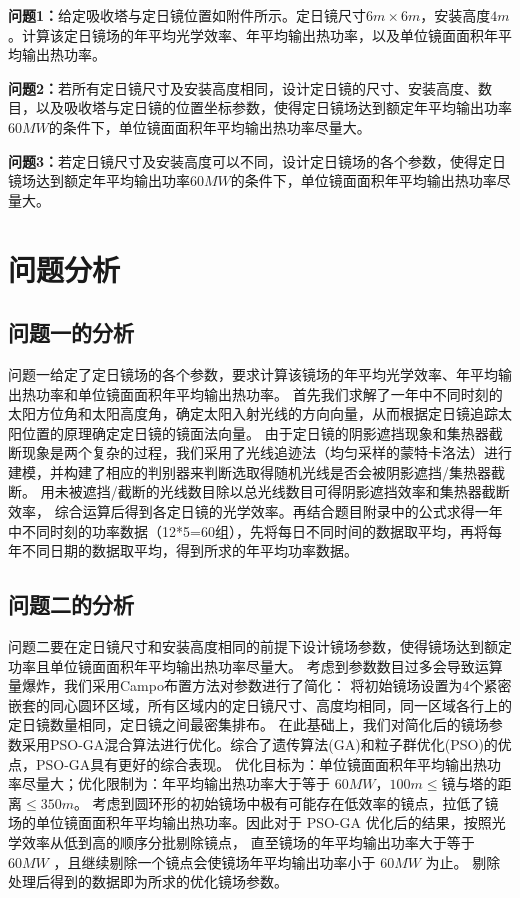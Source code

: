 \documentclass{article}
\numberwithin{equation}{subsection}
\begin{document}
\textbf{问题1：}给定吸收塔与定日镜位置如附件所示。定日镜尺寸$6m\times 6m$，安装高度$4m$。计算该定日镜场的年平均光学效率、年平均输出热功率，以及单位镜面面积年平均输出热功率。

\textbf{问题2：}若所有定日镜尺寸及安装高度相同，设计定日镜的尺寸、安装高度、数目，以及吸收塔与定日镜的位置坐标参数，使得定日镜场达到额定年平均输出功率$60MW$的条件下，单位镜面面积年平均输出热功率尽量大。

\textbf{问题3：}若定日镜尺寸及安装高度可以不同，设计定日镜场的各个参数，使得定日镜场达到额定年平均输出功率$60MW$的条件下，单位镜面面积年平均输出热功率尽量大。

{\centering\section{问题分析}}

\subsection{问题一的分析}
问题一给定了定日镜场的各个参数，要求计算该镜场的年平均光学效率、年平均输出热功率和单位镜面面积年平均输出热功率。
首先我们求解了一年中不同时刻的太阳方位角和太阳高度角，确定太阳入射光线的方向向量，从而根据定日镜追踪太阳位置的原理确定定日镜的镜面法向量。
由于定日镜的阴影遮挡现象和集热器截断现象是两个复杂的过程，我们采用了光线追迹法（均匀采样的蒙特卡洛法）进行建模，并构建了相应的判别器来判断选取得随机光线是否会被阴影遮挡/集热器截断。
用未被遮挡/截断的光线数目除以总光线数目可得阴影遮挡效率和集热器截断效率，
综合运算后得到各定日镜的光学效率。再结合题目附录中的公式求得一年中不同时刻的功率数据（12*5=60组），先将每日不同时间的数据取平均，再将每年不同日期的数据取平均，得到所求的年平均功率数据。

\subsection{问题二的分析}
问题二要在定日镜尺寸和安装高度相同的前提下设计镜场参数，使得镜场达到额定功率且单位镜面面积年平均输出热功率尽量大。
考虑到参数数目过多会导致运算量爆炸，我们采用Campo布置方法\cite{7}对参数进行了简化：
将初始镜场设置为4个紧密嵌套的同心圆环区域，所有区域内的定日镜尺寸、高度均相同，同一区域各行上的定日镜数量相同，定日镜之间最密集排布。
在此基础上，我们对简化后的镜场参数采用PSO-GA混合算法进行优化。综合了遗传算法(GA)和粒子群优化(PSO)的优点，PSO-GA具有更好的综合表现。\cite{8}
优化目标为：单位镜面面积年平均输出热功率尽量大；优化限制为：年平均输出热功率大于等于 $ 60 MW$，$100m\leq$镜与塔的距离$\leq 350m$。
考虑到圆环形的初始镜场中极有可能存在低效率的镜点，拉低了镜场的单位镜面面积年平均输出热功率。因此对于 PSO-GA 优化后的结果，按照光学效率从低到高的顺序分批剔除镜点，
直至镜场的年平均输出功率大于等于 $60M W$ ，且继续剔除一个镜点会使镜场年平均输出功率小于 $60M W$ 为止。
剔除处理后得到的数据即为所求的优化镜场参数。
\end{document}
